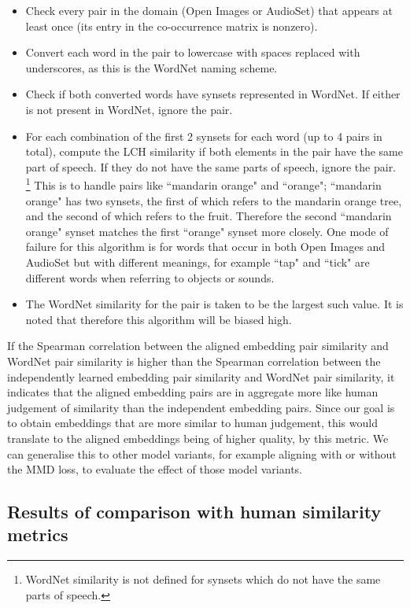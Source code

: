 \begin{itemize}
    \item Check every pair in the domain (Open Images or AudioSet) that appears at least once (its entry in the co-occurrence matrix is nonzero). 
    \item Convert each word in the pair to lowercase with spaces replaced with underscores, as this is the WordNet naming scheme.
    \item Check if both converted words have synsets represented in WordNet. If either is not present in WordNet, ignore the pair.
    \item For each combination of the first 2 synsets for each word (up to 4 pairs in total), compute the LCH similarity if both elements in the pair have the same part of speech. If they do not have the same parts of speech, ignore the pair. \footnote{WordNet similarity is not defined for synsets which do not have the same parts of speech. } This is to handle pairs like ``mandarin orange" and ``orange"; ``mandarin orange" has two synsets, the first of which refers to the mandarin orange tree, and the second of which refers to the fruit. Therefore the second ``mandarin orange" synset matches the first ``orange" synset more closely. One mode of failure for this algorithm is for words that occur in both Open Images and AudioSet but with different meanings, for example ``tap" and ``tick" are different words when referring to objects or sounds. 
    \item The WordNet similarity for the pair is taken to be the largest such value. It is noted that therefore this algorithm will be biased high.
\end{itemize}

If the Spearman correlation between the aligned embedding pair similarity and WordNet pair similarity is higher than the Spearman correlation between the independently learned embedding pair similarity and WordNet pair similarity, it indicates that the aligned embedding pairs are in aggregate more like human judgement of similarity than the independent embedding pairs. Since our goal is to obtain embeddings that are more similar to human judgement, this would translate to the aligned embeddings being of higher quality, by this metric. We can generalise this to other model variants, for example aligning with or without the MMD loss, to evaluate the effect of those model variants. 

\newpage

\subsection{Results of comparison with human similarity metrics}

